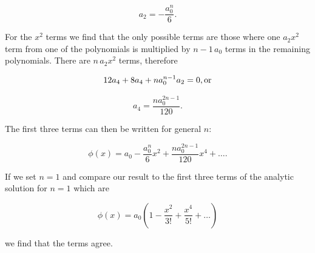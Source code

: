 \documentclass[12pt, manuscript]{article}
\begin{document}
\begin{equation}
a_2 = -\frac{a_0^n}{6}.
\end{equation}

\noindent For the $x^2$ terms we find that the only possible terms are those where one $a_2x^2$ term from one of the polynomials is multiplied by $n-1\,a_0$ terms in the remaining polynomials. There are $n\,a_2x^2$ terms, therefore

\begin{equation}
12a_4 + 8a_4 + na_0^{n-1}a_2 = 0, \text{or} \notag
\end{equation}

\begin{equation}
a_4 = \frac{na_0^{2n-1}}{120}.
\end{equation}

\noindent The first three terms can then be written for general $n$:

\begin{equation}
\phi \left( x \right) = a_0 - \frac{a_0^n}{6}x^2 + \frac{na_0^{2n-1}}{120}x^4 + \dots.
\end{equation}

\noindent If we set $n=1$ and compare our result to the first three terms of the analytic solution for $n=1$ which are

\begin{equation}
\phi \left( x \right) = a_0 \left(1 - \frac{x^2}{3!} + \frac{x^4}{5!} + \dots \right)
\end{equation}

\noindent we find that the terms agree.
\end{document}

